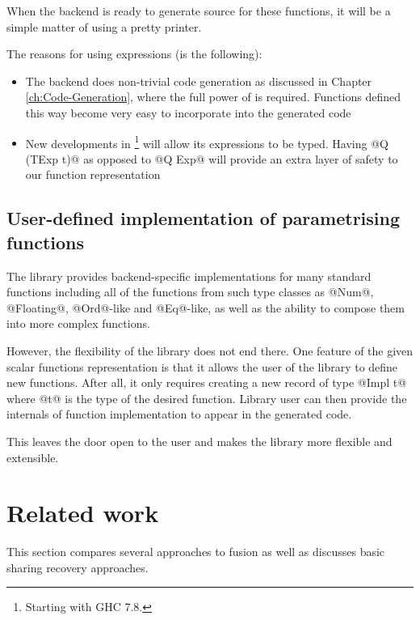 \documentclass[preamble.tex]{subfiles}
\begin{document}
When the backend is ready to generate \Haskell source for these functions, it will be a simple matter of using a  pretty printer. 

The reasons for using  expressions (is the following):
\begin{itemize}
\item The backend does non-trivial code generation as discussed in Chapter \ref{ch:Code-Generation}, where the full power of  is required. Functions defined this way become very easy to incorporate into the generated code
\item New developments in \footnote{Starting with GHC 7.8.} will allow its expressions to be typed. Having @Q (TExp t)@ as opposed to @Q Exp@ will provide an extra layer of safety to our function representation
\end{itemize}


\subsection{User-defined implementation of parametrising functions}

The library provides backend-specific implementations for many standard functions including all of the functions from such type classes as @Num@, @Floating@, @Ord@-like and @Eq@-like, as well as the ability to compose them into more complex functions.

However, the flexibility of the library does not end there. One feature of the given scalar functions representation is that it allows the user of the library to define new functions. After all, it only requires creating a new record of type @Impl t@ where @t@ is the type of the desired function. Library user can then provide the internals of function implementation to appear in the generated code.

This leaves the door open to the user and makes the library more flexible and extensible.


\clearpage
\section{Related work}

This section compares several approaches to fusion as well as discusses basic sharing recovery approaches.
\end{document}
